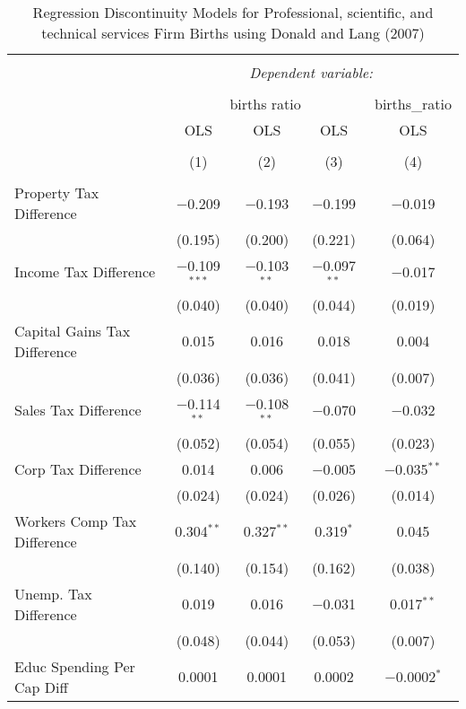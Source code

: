 
\begin{table}[!htbp] \centering 
  \caption{Regression Discontinuity Models for  Professional, scientific, and technical services Firm Births using Donald and Lang (2007)} 
  \label{} 
\begin{tabular}{@{\extracolsep{5pt}}lcccc} 
\\[-1.8ex]\hline 
\hline \\[-1.8ex] 
 & \multicolumn{4}{c}{\textit{Dependent variable:}} \\ 
\cline{2-5} 
\\[-1.8ex] & \multicolumn{3}{c}{births ratio} & births\_ratio \\ 
 & OLS & OLS & OLS & OLS \\ 
\\[-1.8ex] & (1) & (2) & (3) & (4)\\ 
\hline \\[-1.8ex] 
 Property Tax Difference & $-$0.209 & $-$0.193 & $-$0.199 & $-$0.019 \\ 
  & (0.195) & (0.200) & (0.221) & (0.064) \\ 
  Income Tax Difference & $-$0.109$^{***}$ & $-$0.103$^{**}$ & $-$0.097$^{**}$ & $-$0.017 \\ 
  & (0.040) & (0.040) & (0.044) & (0.019) \\ 
  Capital Gains Tax Difference & 0.015 & 0.016 & 0.018 & 0.004 \\ 
  & (0.036) & (0.036) & (0.041) & (0.007) \\ 
  Sales Tax Difference & $-$0.114$^{**}$ & $-$0.108$^{**}$ & $-$0.070 & $-$0.032 \\ 
  & (0.052) & (0.054) & (0.055) & (0.023) \\ 
  Corp Tax Difference & 0.014 & 0.006 & $-$0.005 & $-$0.035$^{**}$ \\ 
  & (0.024) & (0.024) & (0.026) & (0.014) \\ 
  Workers Comp Tax Difference & 0.304$^{**}$ & 0.327$^{**}$ & 0.319$^{*}$ & 0.045 \\ 
  & (0.140) & (0.154) & (0.162) & (0.038) \\ 
  Unemp. Tax Difference & 0.019 & 0.016 & $-$0.031 & 0.017$^{**}$ \\ 
  & (0.048) & (0.044) & (0.053) & (0.007) \\ 
  Educ Spending Per Cap Diff & 0.0001 & 0.0001 & 0.0002 & $-$0.0002$^{*}$ \\ 

\end{tabular}
\end{table}
